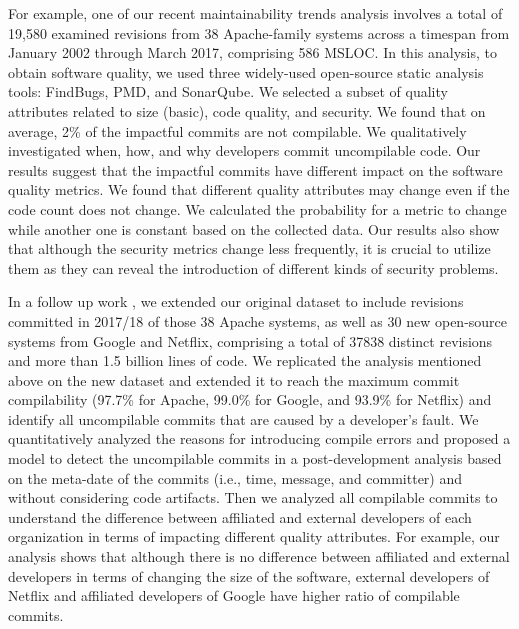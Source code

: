 For example,
one of our recent maintainability trends analysis \cite{Behnamghader2017qrs} involves a total of 19,580 examined revisions from 38 Apache-family systems across a timespan from January 2002 through March 2017, comprising 586 MSLOC.
In this analysis, to obtain software quality, we used three widely-used open-source static analysis tools: FindBugs, PMD, and SonarQube.
We selected a subset of quality attributes related to size (basic), code quality, and security.
We found that on average, 2\% of the impactful  commits are  not compilable. We qualitatively investigated when, how, and why developers commit uncompilable code. Our results suggest that the impactful commits have different impact on the software quality metrics. We found that different quality attributes may change even if the code count does not change.
We calculated the probability for a metric to change while another one is constant based on the collected data.
Our results also show that although the security metrics change less frequently, it is crucial to utilize them as they can reveal the introduction of different kinds of security problems.

In a follow up work \cite{Behnamghader2018esem}, we extended
our original dataset
to include revisions committed in 2017/18 of those 38 Apache systems, as well as 30 new open-source systems from Google and Netflix, comprising a total of 37838 distinct revisions and more than 1.5 billion lines of code.
We replicated the analysis mentioned above on the new dataset and extended it to reach the maximum commit compilability (97.7\% for Apache, 99.0\% for Google, and 93.9\% for Netflix) and identify all uncompilable commits that are caused by a developer's fault.
We quantitatively analyzed the reasons for introducing compile errors and proposed a model to detect the uncompilable commits in a post-development analysis based on the meta-date of the commits (i.e., time, message, and committer) and without considering code artifacts.
Then we analyzed all compilable commits to understand the difference between affiliated and external developers of each organization in terms of impacting different quality attributes. 
For example, our analysis shows that although there is no difference between affiliated and external developers in terms of changing the size of the software, external developers of Netflix and affiliated developers of Google have higher ratio of compilable commits.


